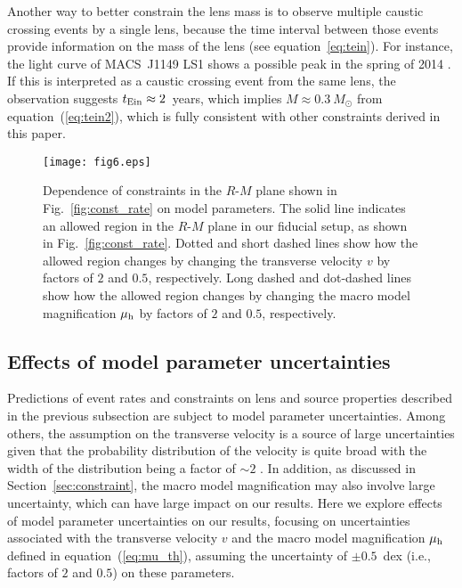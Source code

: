 \documentclass[showpacs,twocolumn,preprintnumbers,amsmath,amssymb,superscriptaddress,nofootinbib]{revtex4}
\newcommand{\morv}[1]{#1}
\begin{document}
Another way to better constrain the lens mass is to observe multiple
caustic crossing events by a single lens, because the time interval
between those events provide information on the mass of the lens (see
equation~\ref{eq:tein}). For instance, the light curve of MACS~J1149
LS1 shows a possible peak in the spring of 2014
\citep{Kelly:2017fps}. If this is interpreted as a caustic crossing
event from the same lens, the observation suggests $t_{\rm Ein}\approx
2$~years, which implies $M\approx 0.3~M_\odot$ from
equation~(\ref{eq:tein2}), which is fully consistent with other
constraints derived in this paper. 

\begin{figure}[t]
\begin{center}
\texttt{[image: fig6.eps]}
\end{center}
\caption{\morv{Dependence of constraints in the $R$-$M$ plane shown in
  Fig.~\ref{fig:const_rate} on model parameters. The solid line
  indicates an allowed region in the $R$-$M$ plane in our fiducial
  setup, as shown in Fig.~\ref{fig:const_rate}. Dotted and short
  dashed lines show how the allowed region changes by changing the
  transverse velocity $v$ by factors of $2$ and $0.5$,
  respectively. Long dashed and dot-dashed lines show  how the allowed
  region changes by changing the macro model magnification $\mu_{\rm
    h}$ by factors of $2$ and $0.5$, respectively.}}
\label{fig:consterr}
\end{figure}

\subsection{Effects of model parameter uncertainties}
\label{sec:uncertainty}

\morv{Predictions of event rates and constraints on lens and source
  properties described in the previous subsection are subject to model
  parameter uncertainties. Among others, the assumption on the
  transverse velocity is a source of large uncertainties given that
  the probability distribution of the velocity is quite broad with the
  width of the distribution being a factor of $\sim 2$
  \cite{Dolag:2013hj}. In addition, as discussed in
  Section~\ref{sec:constraint}, the macro model magnification may also
  involve large uncertainty, which can have large impact on our
  results. Here we explore effects of model parameter uncertainties on
  our results, focusing on uncertainties associated with the
  transverse velocity $v$ and the macro model magnification $\mu_{\rm
    h}$ defined in equation~(\ref{eq:mu_th}), assuming the uncertainty
  of $\pm 0.5$~dex (i.e., factors of $2$ and $0.5$) on these
  parameters. }
\end{document}
